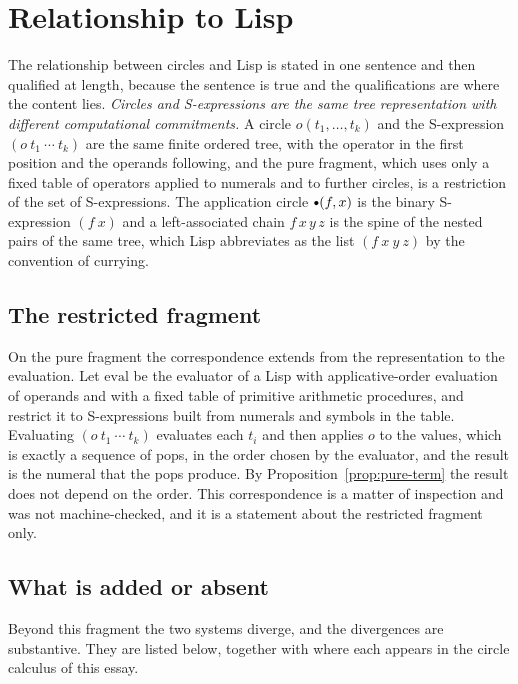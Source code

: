\section{Relationship to Lisp}\label{sec:lisp}

The relationship between circles and Lisp is stated in one sentence and then qualified at length, because the sentence is true and the qualifications are where the content lies. \emph{Circles and S-expressions are the same tree representation with different computational commitments.} A circle $o(t_1,\dots,t_k)$ and the S-expression $(o\ t_1\ \cdots\ t_k)$ are the same finite ordered tree, with the operator in the first position and the operands following, and the pure fragment, which uses only a fixed table of operators applied to numerals and to further circles, is a restriction of the set of S-expressions. The application circle $\App(f,x)$ is the binary S-expression $(f\ x)$ and a left-associated chain $f\,x\,y\,z$ is the spine of the nested pairs of the same tree, which Lisp abbreviates as the list $(f\ x\ y\ z)$ by the convention of currying.

\subsection{The restricted fragment}

On the pure fragment the correspondence extends from the representation to the evaluation. Let $\mathrm{eval}$ be the evaluator of a Lisp with applicative-order evaluation of operands and with a fixed table of primitive arithmetic procedures, and restrict it to S-expressions built from numerals and symbols in the table. Evaluating $(o\ t_1\ \cdots\ t_k)$ evaluates each $t_i$ and then applies $o$ to the values, which is exactly a sequence of pops, in the order chosen by the evaluator, and the result is the numeral that the pops produce. By Proposition~\ref{prop:pure-term} the result does not depend on the order. This correspondence is a matter of inspection and was not machine-checked, and it is a statement about the restricted fragment only.

\subsection{What is added or absent}

Beyond this fragment the two systems diverge, and the divergences are substantive. They are listed below, together with where each appears in the circle calculus of this essay.

